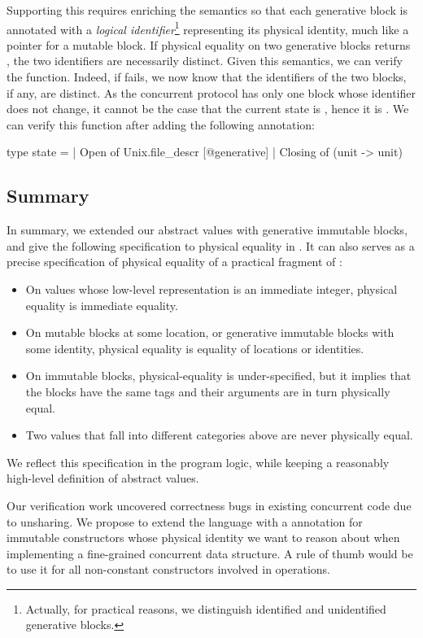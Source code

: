 Supporting this requires enriching the \Zoo semantics so that each generative block is annotated with a \emph{logical identifier}\footnote{Actually, for practical reasons, we distinguish identified and unidentified generative blocks.} representing its physical identity, much like a pointer for a mutable block.
If physical equality on two generative blocks returns , the two identifiers are necessarily distinct.
Given this semantics, we can verify the  function.
Indeed, if  fails, we now know that the identifiers of the two blocks, if any, are distinct.
As the concurrent protocol has only one  block whose identifier does not change, it cannot be the case that the current state is , hence it is .
We can verify this function after adding the following annotation:

\begin{ocamlcode}
type state =
  | Open of Unix.file_descr [@generative]
  | Closing of (unit -> unit)
\end{ocamlcode}

\subsection{Summary}

In summary, we extended our abstract values with generative immutable blocks, and give the following specification to physical equality in \ZooLang. It can also serves as a precise specification of physical equality of a practical fragment of \OCaml:

\begin{itemize}
\item On values whose low-level representation is
  an immediate integer, physical equality is immediate equality.
\item On mutable blocks at some location, or generative immutable blocks with some identity, physical equality is equality of locations or identities.
\item On immutable blocks, physical-equality is under-specified, but it implies that the blocks have the same tags and their arguments are in turn physically equal.
\item Two values that fall into different categories above are never physically equal.
\end{itemize}

We reflect this specification in the \Zoo program logic, while keeping a reasonably high-level definition of abstract values.

Our verification work uncovered correctness bugs in existing \OCaml concurrent code due to unsharing. We propose to extend the language with a \ocamlinline{[@generative]} annotation for immutable constructors whose physical identity we want to reason about when implementing a fine-grained concurrent data structure. A rule of thumb would be to use it for all non-constant constructors involved in  operations.

